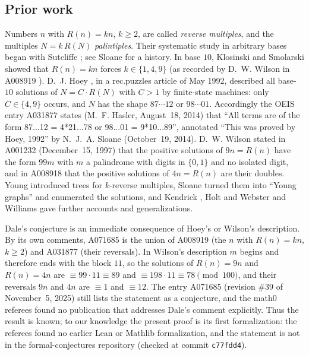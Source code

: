 \documentclass[11pt]{amsart}
\theoremstyle{plain}
\theoremstyle{definition}
\begin{document}
\subsection*{Prior work}
Numbers $n$ with $R(n)=kn$, $k\ge2$, are called \emph{reverse multiples}, and the multiples $N=k\,R(N)$ \emph{palintiples}. Their systematic study in arbitrary bases began with Sutcliffe \cite{Sutcliffe}; see Sloane \cite{Sloane} for a history. In base $10$, Klosinski and Smolarski \cite{KS} showed that $R(n)=kn$ forces $k\in\{1,4,9\}$ (as recorded by D.~W. Wilson in A008919 \cite{A008919}). D.~J. Hoey \cite{Hoey}, in a rec.puzzles article of May 1992, described all base-$10$ solutions of $N=C\cdot R(N)$ with $C>1$ by finite-state machines: only $C\in\{4,9\}$ occurs, and $N$ has the shape $87\cdots12$ or $98\cdots01$. Accordingly the OEIS entry A031877 \cite{A031877} states (M.~F. Hasler, August~18, 2014) that ``All terms are of the form 87...12 = 4*21...78 or 98...01 = 9*10...89'', annotated ``This was proved by Hoey, 1992'' by N.~J.~A. Sloane (October~19, 2014). D.~W. Wilson stated in A001232 \cite{A001232} (December~15, 1997) that the positive solutions of $9n=R(n)$ have the form $99m$ with $m$ a palindrome with digits in $\{0,1\}$ and no isolated digit, and in A008918 \cite{A008918} that the positive solutions of $4n=R(n)$ are their doubles. Young \cite{Young,Young2} introduced trees for $k$-reverse multiples, Sloane \cite{Sloane} turned them into ``Young graphs'' and enumerated the solutions, and Kendrick \cite{Kendrick}, Holt \cite{Holt} and Webster and Williams \cite{WW} gave further accounts and generalizations.

Dale's conjecture is an immediate consequence of Hoey's or Wilson's description. By its own comments, A071685 is the union of A008919 (the $n$ with $R(n)=kn$, $k\ge2$) and A031877 (their reversals). In Wilson's description $m$ begins and therefore ends with the block $11$, so the solutions of $R(n)=9n$ and $R(n)=4n$ are $\equiv99\cdot11\equiv89$ and $\equiv198\cdot11\equiv78\pmod{100}$, and their reversals $9n$ and $4n$ are $\equiv1$ and $\equiv12$. The entry A071685 (revision \#39 of November~5, 2025) still lists the statement as a conjecture, and the math0 referees found no publication that addresses Dale's comment explicitly. Thus the result is known; to our knowledge the present proof is its first formalization: the referees found no earlier Lean or Mathlib formalization, and the statement is not in the formal-conjectures repository \cite{FC} (checked at commit \texttt{c77fdd4}).
\end{document}
